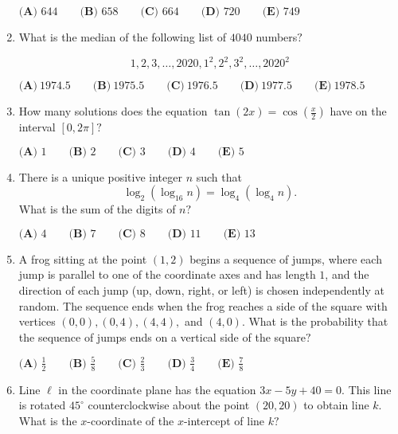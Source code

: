 \documentclass{article}
\begin{document}
\begin{enumerate}[label=\arabic*., itemsep=0.5em]
\(\textbf{(A) } 644    \qquad \textbf{(B) } 658   \qquad \textbf{(C) } 664   \qquad \textbf{(D) } 720   \qquad \textbf{(E) } 749\)\par \vspace{0.5em}\item What is the median of the following list of \(4040\) numbers\(?\)

\begin{equation*}
1, 2, 3, \ldots, 2020, 1^2, 2^2, 3^2, \ldots, 2020^2
\end{equation*}

\( \textbf{(A)}\ 1974.5\qquad\textbf{(B)}\ 1975.5\qquad\textbf{(C)}\ 1976.5\qquad\textbf{(D)}\ 1977.5\qquad\textbf{(E)}\ 1978.5 \)\par \vspace{0.5em}\item How many solutions does the equation \(\tan{(2x)} = \cos{(\tfrac{x}{2})}\) have on the interval \([0, 2\pi]?\)

\(\textbf{(A) } 1 \qquad \textbf{(B) } 2 \qquad \textbf{(C) } 3 \qquad \textbf{(D) } 4 \qquad \textbf{(E) } 5\)\par \vspace{0.5em}\item There is a unique positive integer \(n\) such that
\begin{equation*}
\log_2{(\log_{16}{n})} = \log_4{(\log_4{n})}.
\end{equation*}
What is the sum of the digits of \(n?\)

\(\textbf{(A) } 4 \qquad \textbf{(B) } 7 \qquad \textbf{(C) } 8 \qquad \textbf{(D) } 11 \qquad \textbf{(E) } 13\)\par \vspace{0.5em}\item A frog sitting at the point \((1, 2)\) begins a sequence of jumps, where each jump is parallel to one of the coordinate axes and has length \(1\), and the direction of each jump (up, down, right, or left) is chosen independently at random. The sequence ends when the frog reaches a side of the square with vertices \((0,0), (0,4), (4,4),\) and \((4,0)\). What is the probability that the sequence of jumps ends on a vertical side of the square\(?\)

\(\textbf{(A) } \frac{1}{2} \qquad \textbf{(B) } \frac{5}{8} \qquad \textbf{(C) } \frac{2}{3} \qquad \textbf{(D) } \frac{3}{4} \qquad \textbf{(E) } \frac{7}{8}\)\par \vspace{0.5em}\item Line \(\ell\) in the coordinate plane has the equation \(3x - 5y + 40 = 0\). This line is rotated \(45^{\circ}\) counterclockwise about the point \((20, 20)\) to obtain line \(k\). What is the \(x\)-coordinate of the \(x\)-intercept of line \(k?\)


\end{enumerate}
\end{document}
